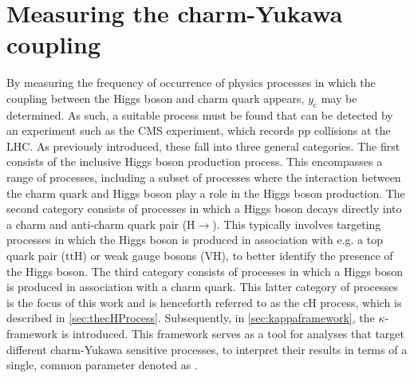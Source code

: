 \section{Measuring the charm-Yukawa coupling}
\label{sec:measuringYc}
By measuring the frequency of occurrence of physics processes in which the coupling between the Higgs boson and charm quark appears, $y_{\mathrm{c}}$ may be determined. As such, a suitable process must be found that can be detected by an experiment such as the CMS experiment, which records pp collisions at the LHC. As previously introduced, these fall into three general categories. The first consists of the inclusive Higgs boson production process. This encompasses a range of processes, including a subset of processes where the interaction between the charm quark and Higgs boson play a role in the Higgs boson production. The second category consists of processes in which a Higgs boson decays directly into a charm and anti-charm quark pair (H$\rightarrow$\ccbar). This typically involves targeting processes in which the Higgs boson is produced in association with e.g. a top quark pair (t$\overline{\mathrm{t}}$H) or weak gauge bosons (VH), to better identify the presence of the Higgs boson. The third category consists of processes in which a Higgs boson is produced in association with a charm quark. This latter category of processes is the focus of this work and is henceforth referred to as the cH process, which is described in \autoref{sec:thecHProcess}. Subsequently, in \autoref{sec:kappaframework}, the $\kappa$-framework is introduced. This framework serves as a tool for analyses that target different charm-Yukawa sensitive processes, to interpret their results in terms of a single, common parameter denoted as \kappac. 

